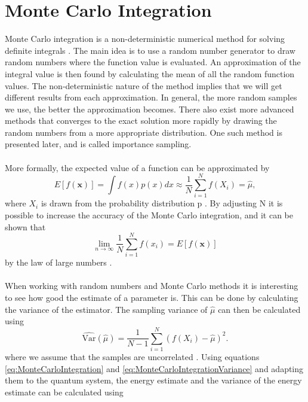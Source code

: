 \section{Monte Carlo Integration}
Monte Carlo integration is a non-deterministic numerical method for solving definite integrals \cite{compstat}. The main idea is to use a random number generator to draw random numbers where the function value is evaluated. An approximation of the integral value is then found by calculating the mean of all the random function values. The non-deterministic nature of the method implies that we will get different results from each approximation. In general, the more random samples we use, the better the approximation becomes. There also exist more advanced methods that converges to the exact solution more rapidly by drawing the random numbers from a more appropriate distribution. One such method is presented later, and is called importance sampling. 
\\
\\
More formally, the expected value of a function can be approximated by 
\begin{equation}
    E[f(\boldsymbol{x})] = \int f(x)p(x)dx \approx \frac{1}{N}\sum_{i=1}^N f(X_i) = \hat{\mu}, 
    \label{eq:MonteCarloIntegration}
\end{equation}
where $X_i$ is drawn from the probability distribution p \cite{compstat}. By adjusting N it is possible to increase the accuracy of the Monte Carlo integration, and it can be shown that 
\begin{equation}
    \lim_{n\to \infty} \frac{1}{N}\sum_{i=1}^N f(x_i) = E[f(\boldsymbol{x})]
\end{equation}
by the law of large numbers \cite{compstat}.
\\
\\
When working with random numbers and Monte Carlo methods it is interesting to see how good the estimate of a parameter is. This can be done by calculating the variance of the estimator. The sampling variance of $\hat{\mu}$ can then be calculated using
\begin{equation}
    \hat{\text{Var}}(\hat{\mu}) =  \frac{1}{N-1}\sum_{i=1}^N (f(X_i) - \hat{\mu})^2.
    \label{eq:MonteCarloIntegrationVariance}
\end{equation}
where we assume that the samples are uncorrelated \cite{compstat}. 
Using equations \ref{eq:MonteCarloIntegration} and \ref{eq:MonteCarloIntegrationVariance} and adapting them to the quantum system, the energy estimate and the variance of the energy estimate can be calculated using
